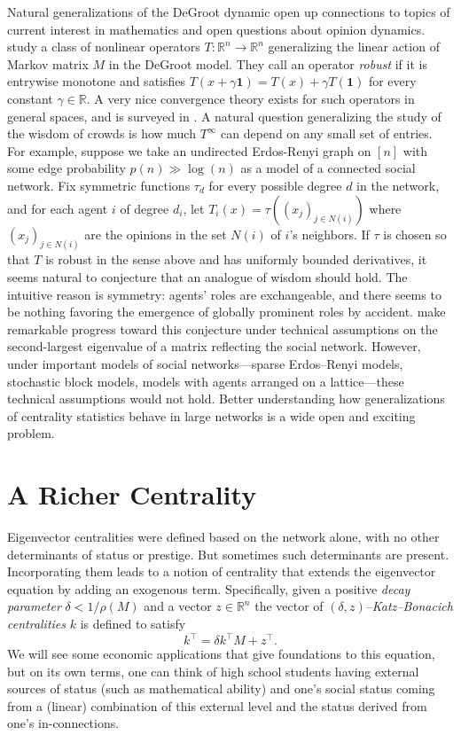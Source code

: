 \documentclass{notices}
\theoremstyle{definition}\newtheorem{problem}{Problem}
\begin{document}
Natural generalizations of the DeGroot dynamic open up connections to topics of current interest in mathematics and open questions about opinion dynamics. \cite{CCL} study a class of nonlinear operators $T : \mathbb{R}^n \to \mathbb{R}^n$ generalizing the linear action of Markov matrix $M$ in the DeGroot model. They call an operator \emph{robust} if it is entrywise monotone and satisfies $T(x+\gamma \bm{1})=T(x)+\gamma T(\bm{1})$ for every constant $\gamma \in \mathbb{R}$. A very nice convergence theory exists for such operators in general spaces, and is surveyed in \cite{CCL,lemmens2012nonlinear}. A natural question generalizing the study of the wisdom of crowds is how much $T^\infty$ can depend on any small set of entries. For example, suppose we take an undirected Erdos-Renyi graph on $[n]$ with some edge probability $p(n) \gg \log(n)$ as a model of a connected social network. Fix symmetric functions $\tau_d$ for every possible degree $d$ in the network, and for each agent $i$ of degree $d_i$, let $T_i(x) = \tau((x_j)_{j \in N(i)})$ where $(x_j)_{j \in N(i)}$ are the opinions in the set $N(i)$ of $i$'s neighbors. If $\tau$ is chosen so that $T$ is robust in the sense above and has uniformly bounded derivatives, it seems natural to conjecture that an analogue of wisdom should hold. The intuitive reason is symmetry: agents' roles are exchangeable, and there seems to be nothing favoring the emergence of globally prominent roles by accident. \cite{CCL} make remarkable progress toward this conjecture under technical  assumptions on the second-largest eigenvalue of a matrix reflecting the social network. However, under important models of social networks---sparse Erdos--Renyi models, stochastic block models, models with agents arranged on a lattice---these technical assumptions would not hold. Better understanding how generalizations of centrality statistics behave in large networks is a wide open and exciting problem.



\section*{A Richer Centrality}



Eigenvector centralities were defined based on the network alone, with no other determinants of status or prestige. But sometimes such determinants are present. Incorporating them leads to a notion of centrality that extends the eigenvector equation by adding an exogenous term. Specifically, given a positive \emph{decay parameter} $\delta  < 1/\rho(M)$ and a vector $z \in \mathbb{R}^n$  the vector of  $(\delta,z)$--\emph{Katz--Bonacich centralities} 
$k$ is defined \cite{Jackson2008} to satisfy
\begin{equation} \label{eq:kb} k^\top = \delta k^\top M  + z^\top. \end{equation}
We will see some economic applications that give foundations to this equation, but on its own terms, one can think of high school students having external sources of status (such as mathematical ability) and one's social status coming from a (linear) combination of this external level and the status derived from one's in-connections.
\end{document}
